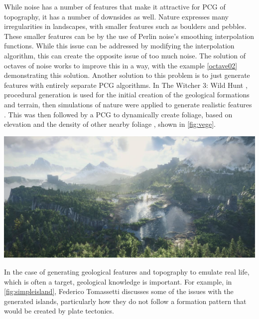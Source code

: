 \documentclass[10pt]{report}
\begin{document}
		While noise has a number of features that make it attractive for PCG of topography, it has a number of downsides as well. Nature expresses many irregularities in landscapes, with smaller features such as boulders and pebbles. These smaller features can be by the use of Perlin noise's smoothing interpolation functions. While this issue can be addressed by modifying the interpolation algorithm, this can create the opposite issue of too much noise. The solution of octaves of noise works to improve this in a way, with the example \autoref{octave02} demonstrating this solution. Another solution to this problem is to just generate features with entirely separate PCG algorithms. In The Witcher 3: Wild Hunt \cite{witcher}, procedural generation is used for the initial creation of the geological formations and terrain, then simulations of nature were applied to generate realistic features \cite{world-machine}. This was then followed by a PCG to dynamically create foliage, based on elevation and the density of other nearby foliage \cite{redengine}, shown in \autoref{fig:vege}. 
		
		\begin{minipage}{\textwidth}
			\centering
			\includegraphics[scale=0.3]{vege}
			\label{fig:vege}
		\end{minipage}
	
		In the case of generating geological features and topography to emulate real life, which is often a target, geological knowledge is important. For example, in \autoref{fig:simpleisland}, Federico Tomassetti discusses some of the issues with the generated islands, particularly how they do not follow a formation pattern that would be created by plate tectonics. 
		
\end{document}
